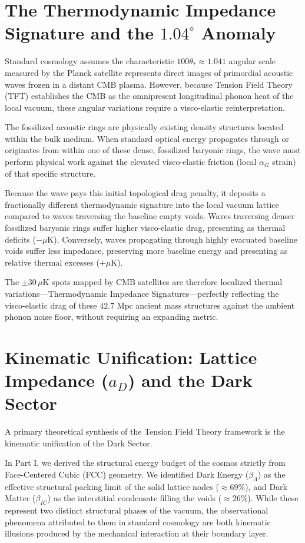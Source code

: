 \section{The Thermodynamic Impedance Signature and the $1.04^\circ$ Anomaly}
\label{sec:thermodynamic_impedance_signature}

Standard cosmology assumes the characteristic $100\theta_* \approx 1.041$ angular scale measured by the Planck satellite represents direct images of primordial acoustic waves frozen in a distant CMB plasma. However, because Tension Field Theory (TFT) establishes the CMB as the omnipresent longitudinal phonon heat of the local vacuum, these angular variations require a visco-elastic reinterpretation.

The fossilized acoustic rings are physically existing density structures located within the bulk medium. When standard optical energy propagates through or originates from within one of these dense, fossilized baryonic rings, the wave must perform physical work against the elevated visco-elastic friction (local $\alpha_G$ strain) of that specific structure.

Because the wave pays this initial topological drag penalty, it deposits a fractionally different thermodynamic signature into the local vacuum lattice compared to waves traversing the baseline empty voids. Waves traversing denser fossilized baryonic rings suffer higher visco-elastic drag, presenting as thermal deficits ($-\mu\text{K}$). Conversely, waves propagating through highly evacuated baseline voids suffer less impedance, preserving more baseline energy and presenting as relative thermal excesses ($+\mu\text{K}$).

The $\pm 30\,\mu\text{K}$ spots mapped by CMB satellites are therefore localized thermal variations---Thermodynamic Impedance Signatures---perfectly reflecting the visco-elastic drag of these $42.7 \text{ Mpc}$ ancient mass structures against the ambient phonon noise floor, without requiring an expanding metric.

\section{Kinematic Unification: Lattice Impedance ($a_D$) and the Dark Sector}
A primary theoretical synthesis of the Tension Field Theory framework is the kinematic unification of the Dark Sector.

In Part I, we derived the structural energy budget of the cosmos strictly from Face-Centered Cubic (FCC) geometry. We identified Dark Energy ($\beta_\Lambda$) as the effective structural packing limit of the solid lattice nodes ($\approx 69\%$), and Dark Matter ($\beta_{IC}$) as the interstitial condensate filling the voids ($\approx 26\%$). While these represent two distinct structural phases of the vacuum, the observational phenomena attributed to them in standard cosmology are both kinematic illusions produced by the mechanical interaction at their boundary layer.

